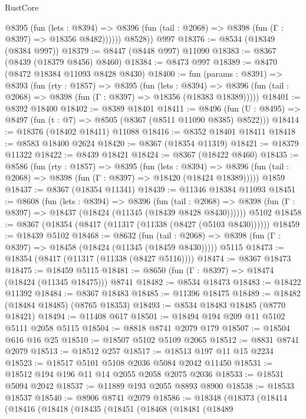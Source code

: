 \begin{lexlean}{RustCore}
\begin{coremodule}
            @8395
              (fun (lets : @8394) =>
              @8396 (fun (tail : @2068) => @8398 (fun (Γ : @8397) => @18356 @8482))))))
        @8528))
    @997
@18376 := @8534 (@18349 (@8384 @997))
@18379 := @8447 (@8448 @997) @11090
@18383 := @8367 (@8439 (@18379 @8456) @8460)
@18384 := @8473 @997
@18389 := @8470 (@8472 @18384 @11093 @8428 @8430)
@18400 := fun (params : @8391) =>
  @8393
    (fun (rty : @1857) =>
    @8395
      (fun (lets : @8394) =>
      @8396 (fun (tail : @2068) => @8398 (fun (Γ : @8397) => @18356 (@18383 @18389)))))
@18401 := @8392 @18400
@18402 := @8389 @18401
@18411 := @8496
    (fun (U : @8495) => @8497 (fun (t : @7) => @8505 (@8367 (@8511 @11090 @8385) @8522)))
@18414 := @18376 (@18402 @18411) @11088
@18416 := @8352 @18401 @18411
@18418 := @8583 @18400 @2624
@18420 := @8367 (@18354 @11319)
@18421 := @18379 @11322
@18422 := @8439 @18421
@18424 := @8367 (@18422 @8460)
@18435 := @8586
    (fun (rty : @1857) =>
    @8395
      (fun (lets : @8394) =>
      @8396 (fun (tail : @2068) => @8398 (fun (Γ : @8397) => @18420 (@18424 @18389)))))
    @1859
@18437 := @8367 (@18354 @11341)
@18439 := @11346 @18384 @11093
@18451 := @8608
    (fun (lets : @8394) =>
    @8396
      (fun (tail : @2068) =>
      @8398 (fun (Γ : @8397) => @18437 (@18424 (@11345 (@18439 @8428 @8430))))))
    @5102
@18458 := @8367 (@18354 (@8417 (@11317 (@11338 (@8427 (@5103 @8430))))))
@18459 := @18439 @5102
@18468 := @8632
    (fun (tail : @2068) => @8398 (fun (Γ : @8397) => @18458 (@18424 (@11345 (@18459 @8430)))))
    @5115
@18473 := @18354 (@8417 (@11317 (@11338 (@8427 @5116))))
@18474 := @8367 @18473
@18475 := @18459 @5115
@18481 := @8650 (fun (Γ : @8397) => @18474 (@18424 (@11345 @18475))) @8741
@18482 := @8534 @18473
@18483 := @18422 @11392
@18484 := @8367 @18483
@18485 := @11396 @18475
@18489 := @18482 (@18484 @18485) (@8765 @18353)
@18493 := @8534 @18483 @18485 (@8770 @18421)
@18494 := @11408 @617
@18501 := @18494 @194 @209 @11 @5102 @5111 @2058 @5115
@18504 := @8818 @8741 @2079 @179
@18507 := @18504 @616 @16 @25
@18510 := @18507 @5102 @5109 @2065
@18512 := @8831 @8741 @2079
@18513 := @18512 @257
@18517 := @18513 @197 @11 @15 @2234
@18523 := @18517 @5101 @5108 @2036 @5084 @2042 @11450
@18531 := @18512 @194 @196 @11 @14 @2055 @2058 @2075 @2036
@18533 := @18531 @5094 @2042
@18537 := @11889 @193 @2055 @8893 @8900
@18538 := @18533 @18537
@18540 := @8906 @8741 @2079
@18586 := @18348
    (@18373
      (@18414
        (@18416
          (@18418
            (@18435
              (@18451
                (@18468
                  (@18481
                    (@18489

\end{coremodule}
\end{lexlean}
